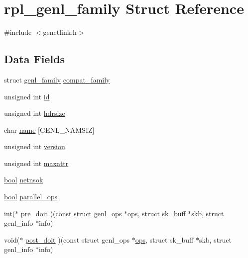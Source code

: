 \hypertarget{structrpl__genl__family}{}\section{rpl\+\_\+genl\+\_\+family Struct Reference}
\label{structrpl__genl__family}


{\ttfamily \#include $<$genetlink.\+h$>$}

\subsection*{Data Fields}
\begin{DoxyCompactItemize}
\item 
struct \hyperlink{genetlink_8h_aba961c2c372b7122ad0c8ae5e7af2f3b}{genl\+\_\+family} \hyperlink{structrpl__genl__family_a6da3fbe86360d91cce207287b2de165d}{compat\+\_\+family}
\item 
unsigned int \hyperlink{structrpl__genl__family_a34a498924fba8a8da9d410d545cfeee2}{id}
\item 
unsigned int \hyperlink{structrpl__genl__family_a9a291012510fda23c4d3bf64859e5de0}{hdrsize}
\item 
char \hyperlink{structrpl__genl__family_a0ee3a650097beb5d2e4a4deb301cb479}{name} \mbox{[}G\+E\+N\+L\+\_\+\+N\+A\+M\+S\+I\+Z\mbox{]}
\item 
unsigned int \hyperlink{structrpl__genl__family_a09a64c948abbbd61907dfd9f0d17663d}{version}
\item 
unsigned int \hyperlink{structrpl__genl__family_a7f6d39207e37f45f704e387488b580d0}{maxattr}
\item 
\hyperlink{types_8h_afaa87723b8417d40fcf45b7330261ef9}{bool} \hyperlink{structrpl__genl__family_a126424f7f454c57970d3aa43fa6f6321}{netnsok}
\item 
\hyperlink{types_8h_afaa87723b8417d40fcf45b7330261ef9}{bool} \hyperlink{structrpl__genl__family_a0c6f86f5d811b297add5721fc9412545}{parallel\+\_\+ops}
\item 
int($\ast$ \hyperlink{structrpl__genl__family_aa5134cfc246e4d34814262c04c2e7a87}{pre\+\_\+doit} )(const struct genl\+\_\+ops $\ast$\hyperlink{structrpl__genl__family_a2d6fa633ee14f455af7965bf76508255}{ops}, struct sk\+\_\+buff $\ast$skb, struct genl\+\_\+info $\ast$info)
\item 
void($\ast$ \hyperlink{structrpl__genl__family_a2b7972eca0ca87a04c701b03fe78e23a}{post\+\_\+doit} )(const struct genl\+\_\+ops $\ast$\hyperlink{structrpl__genl__family_a2d6fa633ee14f455af7965bf76508255}{ops}, struct sk\+\_\+buff $\ast$skb, struct genl\+\_\+info $\ast$info)

\end{DoxyCompactItemize}
